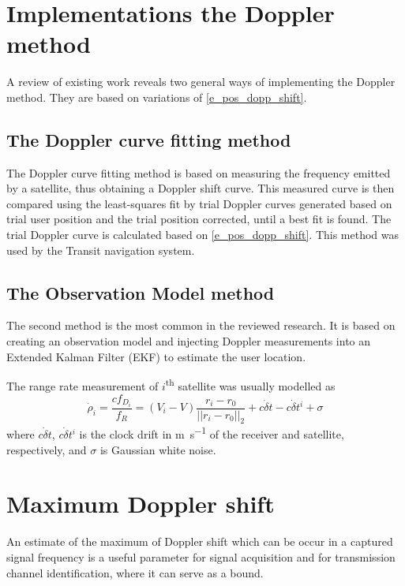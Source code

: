 \section{Implementations the Doppler method}
A review of existing work reveals two general ways of implementing the Doppler method. They are based on variations of \autoref{e_pos_dopp_shift}.

\subsection{The Doppler curve fitting method}
\label{s_pos_curve_fit_method}
The Doppler curve fitting method is based on measuring the frequency emitted by a satellite, thus obtaining a Doppler shift curve. This measured curve is then compared using the least-squares fit by trial Doppler curves generated based on trial user position and the trial position corrected, until a best fit is found. The trial Doppler curve is calculated based on \autoref{e_pos_dopp_shift}. This method was used by the Transit navigation system\cite{sat16}.


\subsection{The Observation Model method}
The second method is the most common in the reviewed research. It is based on creating an observation model and injecting Doppler measurements into an Extended Kalman Filter (EKF) to estimate the user location\cite{sop02, sop03, sop13}.

The range rate measurement of $i$\textsuperscript{th} satellite was usually modelled as
\begin{equation}
   \dot\rho_i = \frac{c f_{D_i}}{f_R} = (V_i - V) \frac{r_i - r_0}{||r_i - r_0||_2} + c \dot\delta t - c \dot \delta t^i + \sigma
\end{equation}
where $c \dot\delta t$, $c \dot \delta t^i$ is the clock drift in \unit{\m\per\s} of the receiver and satellite, respectively, and $\sigma$ is Gaussian white noise\cite{sop02}. 


\section{Maximum Doppler shift}
An estimate of the maximum of Doppler shift which can be occur in a captured signal frequency is a useful parameter for signal acquisition and for transmission channel identification, where it can serve as a bound.

